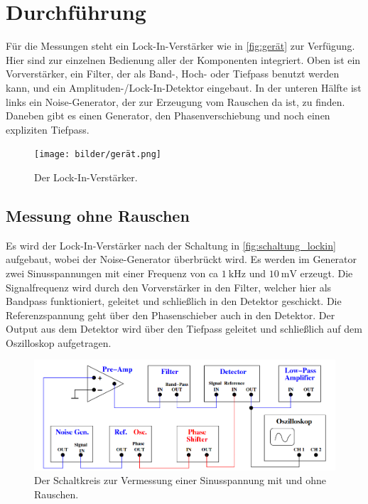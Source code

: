 \section{Durchführung}
\label{sec:Durchführung}

    Für die Messungen steht ein Lock-In-Verstärker wie in \autoref{fig:gerät} zur Verfügung. Hier sind zur einzelnen Bedienung aller der 
    Komponenten integriert. Oben ist ein Vorverstärker, ein Filter, der als Band-, Hoch- oder Tiefpass benutzt werden kann, und ein 
    Amplituden-/Lock-In-Detektor eingebaut. In der unteren Hälfte ist links ein Noise-Generator, der zur Erzeugung vom Rauschen da
    ist, zu finden. Daneben gibt es einen Generator, den Phasenverschiebung und noch einen expliziten Tiefpass.

    \begin{figure}
        \centering
        \texttt{[image: bilder/gerät.png]}
        \caption{Der Lock-In-Verstärker. \cite{anleitung}}
        \label{fig:gerät}
    \end{figure}

\subsection{Messung ohne Rauschen}

    Es wird der Lock-In-Verstärker nach der Schaltung in \autoref{fig:schaltung_lockin} aufgebaut, wobei der Noise-Generator überbrückt wird. 
    Es werden im Generator zwei Sinusspannungen mit einer Frequenz von ca $\SI{1}{\kilo\hertz}$ und $\SI{10}{\milli\volt}$ erzeugt. Die 
    Signalfrequenz wird durch den Vorverstärker in den Filter, welcher hier als Bandpass funktioniert, geleitet und schließlich in den 
    Detektor geschickt. Die Referenzspannung geht über den Phasenschieber auch in den Detektor. Der Output aus dem Detektor wird über
    den Tiefpass geleitet und schließlich auf dem Oszilloskop aufgetragen.

    \begin{figure}
        \centering
        \includegraphics[width=\textwidth]{bilder/schaltkreis_lock_in.png}
        \caption{Der Schaltkreis zur Vermessung einer Sinusspannung mit und ohne Rauschen. \cite{anleitung}}
        \label{fig:schaltung_lockin}
    \end{figure}

